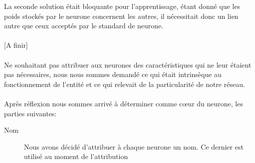 La seconde solution était bloquante pour l'apprentissage, étant donné que les
poids stockés par le neurone concernent les autres, il nécessitait donc un lien
autre que ceux acceptés par le standard de neurone.

\paragraph{}
[A finir]

\paragraph{}
Ne souhaitant pas attribuer aux neurones des caractéristiques qui ne leur étaient
pas nécessaires, nous nous sommes demandé ce qui était intrinsèque au
fonctionnement de l'entité et ce qui relevait de la particularité de notre
réseau.

\paragraph{}
Après réflexion nous sommes arrivé à déterminer comme cœur du neurone, les
parties suivantes:\\

\begin{description}
  \item[Nom] Nous avons décidé d'attribuer à chaque neurone un nom. Ce dernier
    est utilisé au moment de l'attribution
\end{description}
